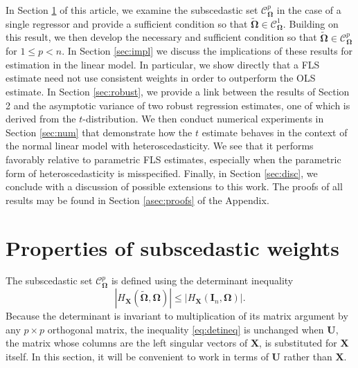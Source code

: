 \documentclass[12pt]{article}
\newcommand{\bl}[1]{{\mathbf #1}}
\newcommand{\bs}[1]{\boldsymbol #1}
\begin{document}
In Section \ref{sec:properties} of this article, we examine the subscedastic set $\mathcal{C}^p_{\bs{\Omega}}$ in the case of a single regressor and provide a sufficient condition so that $\tilde{\bs{\Omega}} \in \mathcal{C}^1_{\bs{\Omega}}$. Building on this result, we then develop the necessary and sufficient condition so that $\tilde{\bs{\Omega}} \in \mathcal{C}^p_{\bs{\Omega}}$ for $1 \leq p < n$. In Section \ref{sec:impl} we discuss the implications of these results for estimation in the linear model. In particular, we show directly that a FLS estimate need not use consistent weights in order to outperform the OLS estimate. In Section \ref{sec:robust}, we provide a link between the results of Section 2 and the asymptotic variance of two robust regression estimates, one of which is derived from the $t$-distribution. We then conduct numerical experiments in Section \ref{sec:num} that demonstrate how the $t$ estimate behaves in the context of the normal linear model with heteroscedasticity. We see that it performs favorably relative to parametric FLS estimates, especially when the parametric form of heteroscedasticity is misspecified. Finally, in Section \ref{sec:disc}, we conclude with a discussion of possible extensions to this work. The proofs of all results may be found in Section \ref{asec:proofs} of the Appendix.

\section{Properties of subscedastic weights}\label{sec:properties}

The subscedastic set $\mathcal{C}^p_{\bs{\Omega}}$ is defined using the determinant inequality
\begin{equation}\label{eq:detineq}
|H_{\bl{X}}(\tilde{\bs{\Omega}}, \bs{\Omega})| \leq |H_{\bl{X}}(\bl{I}_n, \bs{\Omega})|.
\end{equation}
Because the determinant is invariant to multiplication of its matrix argument by any $p \times p$ orthogonal matrix, the inequality \eqref{eq:detineq} is unchanged when $\bl{U}$, the matrix whose columns are the left singular vectors of $\bl{X}$, is substituted for $\bl{X}$ itself. In this section, it will be convenient to work in terms of $\bl{U}$ rather than $\bl{X}$.
\end{document}
